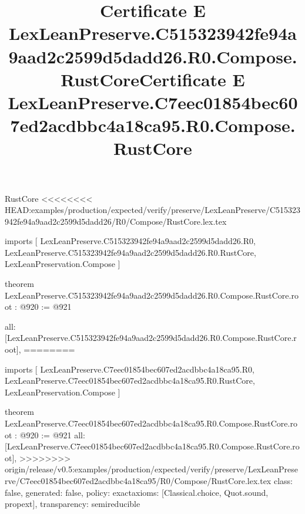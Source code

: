 \begin{lexlean}{RustCore}
<<<<<<<< HEAD:examples/production/expected/verify/preserve/LexLeanPreserve/C515323942fe94a9aad2c2599d5dadd26/R0/Compose/RustCore.lex.tex
\title{Certificate E LexLeanPreserve.C515323942fe94a9aad2c2599d5dadd26.R0.Compose.RustCore}
\begin{coremodule}
imports [
  LexLeanPreserve.C515323942fe94a9aad2c2599d5dadd26.R0,
  LexLeanPreserve.C515323942fe94a9aad2c2599d5dadd26.R0.RustCore,
  LexLeanPreservation.Compose
]

theorem LexLeanPreserve.C515323942fe94a9aad2c2599d5dadd26.R0.Compose.RustCore.root : @920 := @921 {
  all: [LexLeanPreserve.C515323942fe94a9aad2c2599d5dadd26.R0.Compose.RustCore.root],
========
\title{Certificate E LexLeanPreserve.C7eec01854bec607ed2acdbbc4a18ca95.R0.Compose.RustCore}
\begin{coremodule}
imports [
  LexLeanPreserve.C7eec01854bec607ed2acdbbc4a18ca95.R0,
  LexLeanPreserve.C7eec01854bec607ed2acdbbc4a18ca95.R0.RustCore,
  LexLeanPreservation.Compose
]

theorem LexLeanPreserve.C7eec01854bec607ed2acdbbc4a18ca95.R0.Compose.RustCore.root : @920 := @921 {
  all: [LexLeanPreserve.C7eec01854bec607ed2acdbbc4a18ca95.R0.Compose.RustCore.root],
>>>>>>>> origin/release/v0.5:examples/production/expected/verify/preserve/LexLeanPreserve/C7eec01854bec607ed2acdbbc4a18ca95/R0/Compose/RustCore.lex.tex
  class: false,
  generated: false,
  policy: exact{axioms: [Classical.choice, Quot.sound, propext]},
  transparency: semireducible
}


\end{coremodule}}
\end{coremodule}
\end{lexlean}
